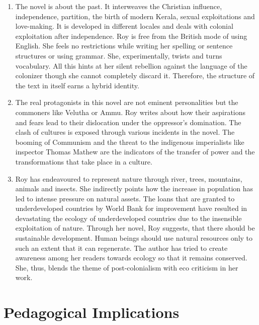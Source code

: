 \begin{enumerate}
  \item The novel is about the past. It interweaves the Christian influence, independence, partition, the birth of modern Kerala, sexual exploitations and love-making. It is developed in different locales and deals with colonial exploitation after independence. Roy is free from the British mode of using English. She feels no restrictions while writing her spelling or sentence structures or using grammar. She, experimentally, twists and turns vocabulary. All this hints at her silent rebellion against the language of the colonizer though she cannot completely discard it. Therefore, the structure of the text in itself earns a hybrid identity.

  \item The real protagonists in this novel are not eminent personalities but the commoners like Velutha or Ammu. Roy writes about how their aspirations and fears lead to their dislocation under the oppressor’s domination. The clash of cultures is exposed through various incidents in the novel. The booming of Communism and the threat to the indigenous imperialists like inspector Thomas Mathew are the indicators of the transfer of power and the transformations that take place in a culture.

  \item Roy has endeavoured to represent nature through river, trees, mountains, animals and insects. She indirectly points how the increase in population has led to intense pressure on natural assets. The loans that are granted to underdeveloped countries by World Bank for improvement have resulted in devastating the ecology of underdeveloped countries due to the insensible exploitation of nature. Through her novel, Roy suggests, that there should be sustainable development. Human beings should use natural resources only to such an extent that it can regenerate. The author has tried to create awareness among her readers towards ecology so that it remains conserved. She, thus, blends the theme of post-colonialism with eco criticism in her work.
\end{enumerate}

\section{Pedagogical Implications}

